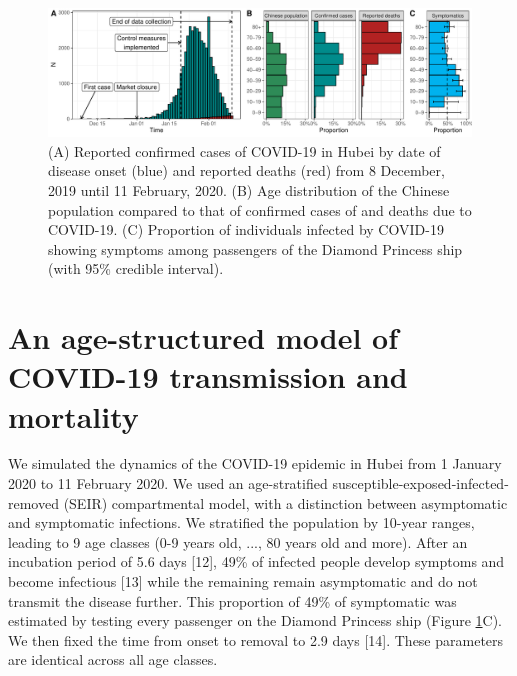 \documentclass{article}
\begin{document}
\begin{figure}[t]
	\includegraphics[width=\linewidth]{../figures/fig_desc.pdf}
	\caption{(A) Reported confirmed cases of COVID-19 in Hubei by date of disease onset (blue) and reported deaths (red) from 8 December, 2019 until 11 February, 2020. (B) Age distribution of the Chinese population compared to that of confirmed cases of and deaths due to COVID-19. (C) Proportion of individuals infected by COVID-19 showing symptoms among passengers of the Diamond Princess ship (with 95\% credible interval).}
	\label{fig:desc}
\end{figure}

\section*{An age-structured model of COVID-19 transmission and mortality}

We simulated the dynamics of the COVID-19 epidemic in Hubei from 1 January 2020 to 11 February 2020. We used an age-stratified susceptible-exposed-infected-removed (SEIR) compartmental model, with a distinction between asymptomatic and symptomatic infections. We stratified the population by 10-year ranges, leading to 9 age classes (0-9 years old, ..., 80 years old and more). After an incubation period of 5.6 days [12], 49\% of infected people develop symptoms and become infectious [13] while the remaining remain asymptomatic and do not transmit the disease further. This proportion of 49\% of symptomatic was estimated by testing every passenger on the Diamond Princess ship (Figure \ref{fig:desc}C). We then fixed the time from onset to removal to 2.9 days [14]. These parameters are identical across all age classes.
\end{document}
